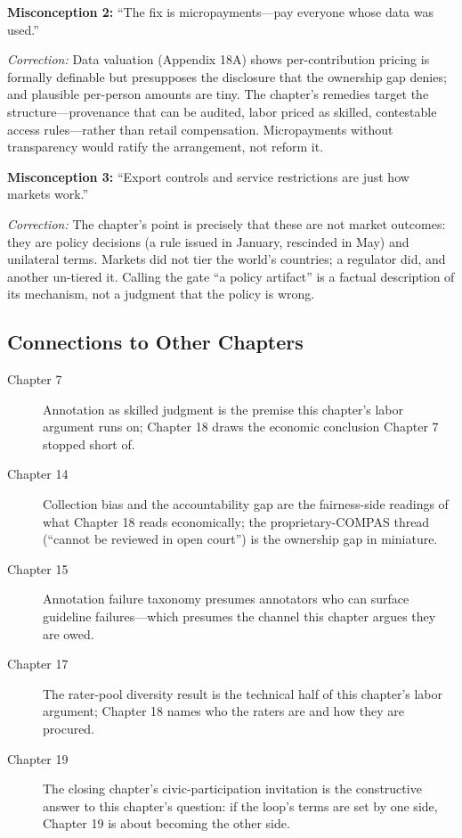 \textbf{Misconception 2:} ``The fix is micropayments---pay everyone whose data was used.''

\textit{Correction:} Data valuation (Appendix 18A) shows per-contribution pricing is formally definable but presupposes the disclosure that the ownership gap denies; and plausible per-person amounts are tiny. The chapter's remedies target the structure---provenance that can be audited, labor priced as skilled, contestable access rules---rather than retail compensation. Micropayments without transparency would ratify the arrangement, not reform it.

\textbf{Misconception 3:} ``Export controls and service restrictions are just how markets work.''

\textit{Correction:} The chapter's point is precisely that these are not market outcomes: they are policy decisions (a rule issued in January, rescinded in May) and unilateral terms. Markets did not tier the world's countries; a regulator did, and another un-tiered it. Calling the gate ``a policy artifact'' is a factual description of its mechanism, not a judgment that the policy is wrong.

\subsection*{Connections to Other Chapters}

\begin{description}
    \item[Chapter 7] Annotation as skilled judgment is the premise this chapter's labor argument runs on; Chapter 18 draws the economic conclusion Chapter 7 stopped short of.
    \item[Chapter 14] Collection bias and the accountability gap are the fairness-side readings of what Chapter 18 reads economically; the proprietary-COMPAS thread (``cannot be reviewed in open court'') is the ownership gap in miniature.
    \item[Chapter 15] Annotation failure taxonomy presumes annotators who can surface guideline failures---which presumes the channel this chapter argues they are owed.
    \item[Chapter 17] The rater-pool diversity result is the technical half of this chapter's labor argument; Chapter 18 names who the raters are and how they are procured.
    \item[Chapter 19] The closing chapter's civic-participation invitation is the constructive answer to this chapter's question: if the loop's terms are set by one side, Chapter 19 is about becoming the other side.
\end{description}

